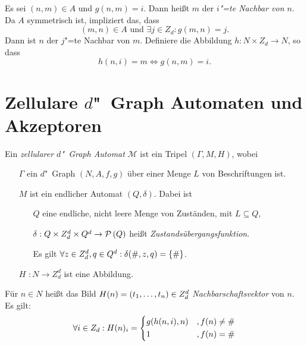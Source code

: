 \documentclass[11pt]{article}
\newcommand{\defWord}[1]{\emph{#1}}
\begin{document}
\begin{definition}[Nachbarschaft]
	Es sei $\left(n, m\right) \in A$ und $g\left(n, m\right) = i$. 
	Dann heißt $m$ der \defWord{$i$"=te Nachbar von $n$}.
	Da $A$ symmetrisch ist, impliziert das, dass 
	\begin{displaymath}
		\left(m, n\right) \in A \text{ und }\exists j \in Z_d : g(m, n) = j.
	\end{displaymath}
	Dann ist $n$ der $j$"=te Nachbar von $m$. 
	Definiere die Abbildung $h : N \times Z_d \rightarrow N$, so dass
	\begin{displaymath}
		 h(n, i) = m \iff g(n, m) = i.
	\end{displaymath}
\end{definition}

\section{Zellulare $d$"~Graph Automaten und Akzeptoren}

\begin{definition}
	Ein \defWord{zellularer $d$"~Graph Automat} $\mathcal{M}$ ist ein Tripel $\left(\Gamma, M, H\right)$, wobei
	\begin{itemize}
		\item[$\Gamma$] ein $d$"~Graph $\left(N, A, f, g\right)$ über einer Menge $L$ von Beschriftungen ist.
		\item[$M$] ist ein endlicher Automat $\left(Q, \delta\right)$. Dabei ist 
		\begin{itemize}
			\item[$Q$] eine endliche, nicht leere Menge von Zuständen, mit $L \subseteq Q$,
			\item[$\delta$] $\cramped{: Q \times Z_d^d \times Q^d \rightarrow \mathcal{P}\left(Q\right)}$  heißt \defWord{Zustandsübergangsfunktion}.
			
			Es gilt $\forall z \in Z_d^d, q \in Q^d : \cramped{\delta(\#, z, q) = \{\# \}}$.
		\end{itemize}
		\item[$H$] $: N \rightarrow Z_d^d$ ist eine Abbildung.  
	\end{itemize}
		Für $n \in N$ heißt das Bild $H(n) = \left(t_1, \text{\dots}, t_n\right) \in Z_d^d$ \defWord{Nachbarschaftsvektor} von $n$. Es gilt: 
		\begin{displaymath}
			\forall i \in Z_d : H(n)_i = 
			\begin{dcases}
				g(h(n, i), n) & ,f(n) \neq \# \\
				1 & , f(n) = \# \\ %
			\end{dcases}
		\end{displaymath}
\end{definition}
\end{document}
